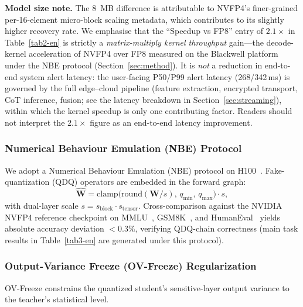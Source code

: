 \documentclass[final,5p,times,number]{elsarticle}
\begin{document}
\noindent\textbf{Model size note.} The 8~MB difference is attributable to NVFP4's finer-grained per-16-element micro-block scaling metadata, which contributes to its slightly higher recovery rate. We emphasise that the ``Speedup vs FP8'' entry of $2.1\times$ in Table~\ref{tab2-en} is strictly a \emph{matrix-multiply kernel throughput} gain---the decode-kernel acceleration of NVFP4 over FP8 measured on the Blackwell platform under the NBE protocol (Section~\ref{sec:method}). It is \emph{not} a reduction in end-to-end system alert latency: the user-facing P50/P99 alert latency (268/342\,ms) is governed by the full edge--cloud pipeline (feature extraction, encrypted transport, CoT inference, fusion; see the latency breakdown in Section~\ref{sec:streaming}), within which the kernel speedup is only one contributing factor. Readers should not interpret the $2.1\times$ figure as an end-to-end latency improvement.

\subsubsection{Numerical Behaviour Emulation (NBE) Protocol}

We adopt a Numerical Behaviour Emulation (NBE) protocol on H100~\cite{NVIDIA2024TRTLLMReleaseNotes,NVIDIA2024TensorRTLLMDocs}. Fake-quantization (QDQ) operators are embedded in the forward graph:
\begin{equation}
\label{eq:nbe}
\widehat{\bm{W}} = \mathrm{clamp}\!\bigl(\mathrm{round}(\bm{W}/s),\,q_{\min},\,q_{\max}\bigr)\cdot s,
\end{equation}
with dual-layer scale $s = s_{\text{block}}\!\cdot\!s_{\text{tensor}}$. Cross-comparison against the NVIDIA NVFP4 reference checkpoint on MMLU~\cite{30}, GSM8K~\cite{31}, and HumanEval~\cite{32} yields absolute accuracy deviation $<0.3\%$, verifying QDQ-chain correctness (main task results in Table~\ref{tab3-en} are generated under this protocol).

\subsubsection{Output-Variance Freeze (OV-Freeze) Regularization}\label{sec:ovfreeze-method}

OV-Freeze constrains the quantized student's sensitive-layer output variance to the teacher's statistical level.
\end{document}
